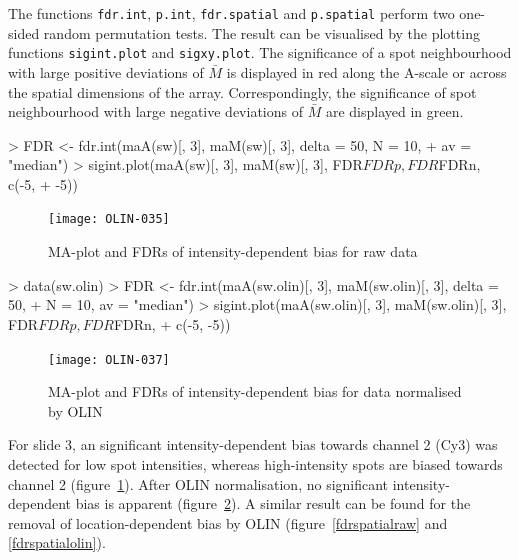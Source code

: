 \documentclass[a4paper,11pt]{article}
\begin{document}

The functions \texttt{fdr.int}, \texttt{p.int}, \texttt{fdr.spatial} and  \texttt{p.spatial}
perform two one-sided random permutation tests. The result can be visualised by 
the plotting functions \texttt{sigint.plot} and \texttt{sigxy.plot}. 
The significance of a spot neighbourhood with large positive deviations of $\bar{M}$ is 
displayed in red along the A-scale or across the spatial dimensions of the array. 
Correspondingly, the significance of spot neighbourhood with large negative 
deviations of  $\bar{M}$ are displayed in green.  


\begin{Schunk}
\begin{Sinput}
> FDR <- fdr.int(maA(sw)[, 3], maM(sw)[, 3], delta = 50, N = 10, 
+     av = "median")
> sigint.plot(maA(sw)[, 3], maM(sw)[, 3], FDR$FDRp, FDR$FDRn, c(-5, 
+     -5))
\end{Sinput}
\end{Schunk}



\begin{figure}[t]
\centering
\texttt{[image: OLIN-035]}
\caption{MA-plot and FDRs of  intensity-dependent bias for raw data }
\label{fdrintraw}
\end{figure}



\begin{Schunk}
\begin{Sinput}
> data(sw.olin)
> FDR <- fdr.int(maA(sw.olin)[, 3], maM(sw.olin)[, 3], delta = 50, 
+     N = 10, av = "median")
> sigint.plot(maA(sw.olin)[, 3], maM(sw.olin)[, 3], FDR$FDRp, FDR$FDRn, 
+     c(-5, -5))
\end{Sinput}
\end{Schunk}



\begin{figure}
\centering
\texttt{[image: OLIN-037]}
\caption{MA-plot and FDRs of  intensity-dependent bias for data normalised by OLIN }
\label{fdrintolin}
\end{figure}

For slide 3, an significant intensity-dependent bias towards channel 2 (Cy3)
was detected for low spot intensities, whereas high-intensity spots are biased
towards channel 2 (figure~\ref{fdrintraw}). After OLIN normalisation, no significant intensity-dependent
bias is apparent (figure~\ref{fdrintolin}). A similar result can be found for the 
removal of location-dependent bias by OLIN (figure~\ref{fdrspatialraw} and \ref{fdrspatialolin}).
\end{document}
